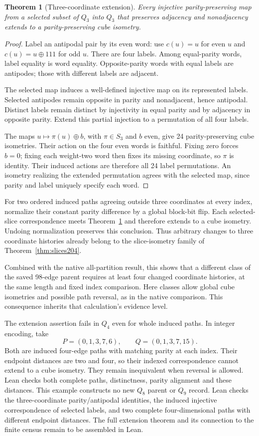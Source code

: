 \documentclass[11pt,a4paper]{article}
\newtheorem{theorem}{Theorem}[section]
\theoremstyle{definition}
\theoremstyle{remark}
\begin{document}
\begin{theorem}[Three-coordinate extension]
\label{thm:extension205}
Every injective parity-preserving map from a selected subset of
$Q_3$ into $Q_3$ that preserves adjacency and nonadjacency extends
to a parity-preserving cube isometry.
\end{theorem}
\begin{proof}
Label an antipodal pair by its even word: use $c(u)=u$ for even
$u$ and $c(u)=u\oplus111$ for odd $u$. There are four labels.
Among equal-parity words, label equality is word equality.
Opposite-parity words with equal labels are antipodes; those with
different labels are adjacent.

The selected map induces a well-defined injective map on its
represented labels. Selected antipodes remain opposite in parity
and nonadjacent, hence antipodal. Distinct labels remain distinct
by injectivity in equal parity and by adjacency in opposite
parity. Extend this partial injection to a permutation of all
four labels.

The maps $u\mapsto\pi(u)\oplus b$, with $\pi\in S_3$ and $b$
even, give 24 parity-preserving cube isometries. Their action on
the four even words is faithful. Fixing zero forces $b=0$;
fixing each weight-two word then fixes its missing coordinate,
so $\pi$ is identity. Their induced actions are therefore all
24 label permutations. An isometry realizing the extended
permutation agrees with the selected map, since parity and label
uniquely specify each word.
\end{proof}

For two ordered induced paths agreeing outside three coordinates
at every index, normalize their constant parity difference by a
global block-bit flip. Each selected-slice correspondence meets
Theorem~\ref{thm:extension205} and therefore extends to a cube
isometry. Undoing normalization preserves this conclusion.
Thus arbitrary changes to three coordinate histories already
belong to the slice-isometry family of Theorem~\ref{thm:slices204}.

Combined with the native all-partition result, this shows that a
different class of the saved 98-edge parent requires at least four
changed coordinate histories, at the same length and fixed index
comparison. Here classes allow global cube isometries and possible
path reversal, as in the native comparison. This consequence
inherits that calculation's evidence level.

The extension assertion fails in $Q_4$ even for whole induced
paths. In integer encoding, take
\[
P=(0,1,3,7,6),\qquad Q=(0,1,3,7,15).
\]
Both are induced four-edge paths with matching parity at each
index. Their endpoint distances are two and four, so their
indexed correspondence cannot extend to a cube isometry. They
remain inequivalent when reversal is allowed. Lean checks both
complete paths, distinctness, parity alignment and these distances.
This example constructs no new $Q_8$ parent or $Q_9$ record.
Lean checks the three-coordinate parity/antipodal identities, the induced injective correspondence of selected labels, and two complete four-dimensional paths with different endpoint distances. The full extension theorem and its connection
to the finite census remain to be assembled in Lean.
\end{document}

